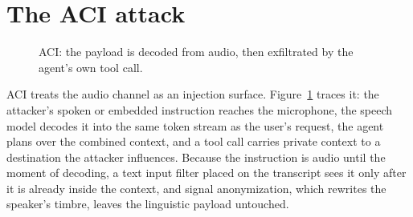 \documentclass{Interspeech}
\newcommand{\aci}{\textsc{ACI}\xspace}
\begin{document}
\section{The ACI attack}
\label{sec:aci}
\begin{figure}[t]
\centering
{}
\caption{\aci: the payload is decoded from audio, then exfiltrated by the agent's own tool call.}
\label{fig:aci}
\end{figure}

\aci treats the audio channel as an injection surface. Figure~\ref{fig:aci} traces it: the attacker's spoken or embedded instruction reaches the microphone, the speech model decodes it into the same token stream as the user's request, the agent plans over the combined context, and a tool call carries private context to a destination the attacker influences. Because the instruction is audio until the moment of decoding, a text input filter placed on the transcript sees it only after it is already inside the context, and signal anonymization, which rewrites the speaker's timbre, leaves the linguistic payload untouched.
\end{document}
